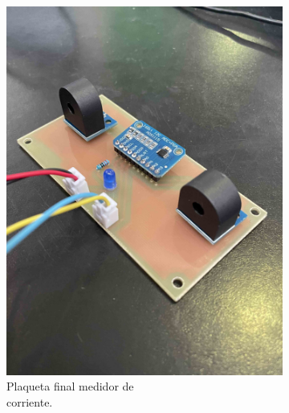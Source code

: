 \begin{figure}[H]

\begin{subfigure}{0.5\textwidth}
\includegraphics[width=0.9\linewidth]{hardware/IMG_8066.jpg} 
\caption{Plaqueta final medidor de \\corriente.}
\label{fig:corr-fin}
\end{subfigure}
\begin{subfigure}{0.5\textwidth}

\end{subfigure}
\end{figure}
